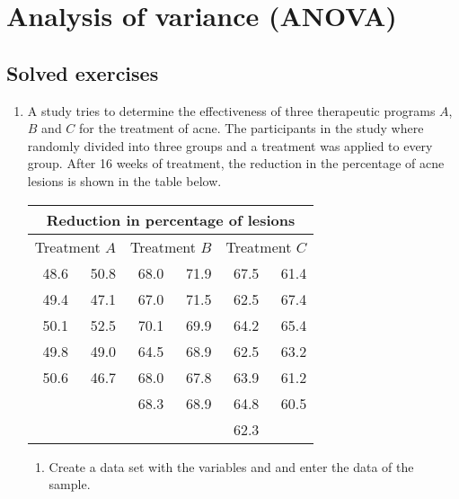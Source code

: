 
\chapter{Analysis of variance (ANOVA)}\label{cha:anova}

\section{Solved exercises}
\begin {enumerate}[leftmargin=*]
\item A study tries to determine the effectiveness of three therapeutic programs $A$, $B$ and $C$ for the treatment of
acne.
The participants in the study where randomly divided into three groups and a treatment was applied to every group. 
After 16 weeks of treatment, the reduction in the percentage of acne lesions is shown in the table below.
\begin{center}
\begin{tabular}{rr|rr|rr}
\multicolumn{6}{c}{Reduction in percentage of lesions} \\
\toprule
\multicolumn{2}{c|}{Treatment $A$} & \multicolumn{2}{c|}{Treatment $B$} & \multicolumn{2}{c}{Treatment $C$} \\
48.6 & 50.8 & 68.0 & 71.9 & 67.5 & 61.4 \\
49.4 & 47.1 & 67.0 & 71.5 & 62.5 & 67.4 \\
50.1 & 52.5 & 70.1 & 69.9 & 64.2 & 65.4 \\
49.8 & 49.0 & 64.5 & 68.9 & 62.5 & 63.2 \\
50.6 & 46.7 & 68.0 & 67.8 & 63.9 & 61.2 \\
     &      & 68.3 & 68.9 & 64.8 & 60.5 \\
     &      &      &      & 62.3 &      \\
\bottomrule
\end{tabular}
\end{center}

\begin{enumerate}
\item Create a data set  with the variables  and  and enter
the data of the sample.


\end{enumerate}
\end{enumerate}
